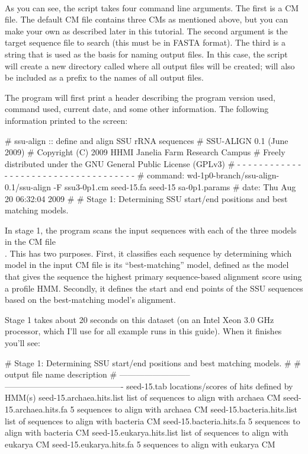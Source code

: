 \\

As you can see, the  script takes four command line
arguments. The first is a CM file. The default CM file
 contains three CMs as mentioned above, but you can
make your own as described later in this tutorial. The second argument is
the target sequence file to search (this must be in FASTA format). The
third is a string that is used as the basis for naming output
files. In this case, the script will create a new directory called
 where all output files will be created; 
will also be included as a prefix to the names of all output files.

\newpage

The program will first print a header describing the program version
used, command used, current date, and some other information. 
The following information printed to the screen:

\begin{sreoutput}
# ssu-align :: define and align SSU rRNA sequences
# SSU-ALIGN 0.1 (June 2009)
# Copyright (C) 2009 HHMI Janelia Farm Research Campus
# Freely distributed under the GNU General Public License (GPLv3)
# - - - - - - - - - - - - - - - - - - - - - - - - - - - - - - - - - - - -
# command: wd-1p0-branch/ssu-align-0.1/ssu-align -F ssu3-0p1.cm seed-15.fa seed-15 sa-0p1.params
# date:    Thu Aug 20 06:32:04 2009
#
# Stage 1: Determining SSU start/end positions and best matching models.
\end{sreoutput}

In stage 1, the program scans the input sequences with each of the
three models in the CM file \\ . This has two
purposes.  First, it classifies each sequence by determining which
model in the input CM file is its ``best-matching'' model, defined as
the model that gives the sequence the highest primary sequence-based
alignment score using a profile HMM. Secondly, it
defines the start and end points of the SSU sequences based on the
best-matching model's alignment.

Stage 1 takes about 20 seconds on this dataset (on an Intel Xeon 3.0
GHz processor, which I'll use for all example runs in this
guide). When it finishes you'll see: 

\begin{sreoutput}
# Stage 1: Determining SSU start/end positions and best matching models.
#
# output file name            description                                
# --------------------------  -------------------------------------------
  seed-15.tab                 locations/scores of hits defined by HMM(s)
  seed-15.archaea.hits.list   list of sequences to align with archaea CM
  seed-15.archaea.hits.fa           5 sequences to align with archaea CM
  seed-15.bacteria.hits.list  list of sequences to align with bacteria CM
  seed-15.bacteria.hits.fa          5 sequences to align with bacteria CM
  seed-15.eukarya.hits.list   list of sequences to align with eukarya CM
  seed-15.eukarya.hits.fa           5 sequences to align with eukarya CM
\end{sreoutput}

